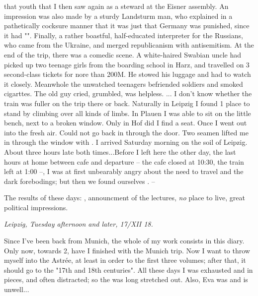 that youth that I then saw again as a steward at the Eisner assembly. An impression was also made by a sturdy Landsturm man, who explained in a pathetically cocksure manner that it was just that Germany was punished, since it had "". Finally, a rather boastful, half-educated interpreter for the Russians, who came from the Ukraine, and merged republicanism with antisemitism. At the end of the trip, there was a comedic scene. A white-haired Swabian uncle had picked up two teenage girls from the boarding school in Harz, and travelled on 3 second-class tickets for nore than 200M. He stowed his luggage  and had to watch it closely. Meanwhole the unwatched teenagers befriended soldiers and smoked cigarttes. The old guy cried, grumbled, was helpless. ... I don't know whether the train was fuller on the trip there or back. Naturally in Leipzig I found 1 place to stand by climbing over all kinds of limbs. In Plauen I was able to sit on the little bench, next to a broken window. Only in Hof did I find a seat. Once I went out into the fresh air. Could not go back in through the door. Two seamen lifted me in through the window with .  I arrived Saturday morning on the soil of Leipzig. About three hours late both times...Before I left here the other day, the last hours at home between cafe and departure -- the cafe closed at 10:30, the train left at 1:00 --, I was at first unbearably angry about the need to travel and the dark forebodings; but then we found ourselves . --

The results of these days: , announcment of the lectures, \textit{no} place to live, great political impressions.


\textit{Leipzig, Tuesday afternoon and later, 17/XII 18.}

Since I've been back from Munich, the whole of my work consists in this diary. Only now, towards 2, have I finished with the Munich trip. Now I want to throw myself into the Astrée, at least in order to  the first three volumes; after that, it should go to the "17th and 18th centuries". All these days I was exhausted and in pieces, and often distracted; so the  was long stretched out. Also, Eva was and is unwell...

\missing

